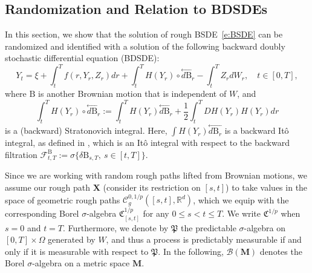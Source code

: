 \documentclass[11pt,reqno]{amsart}
\numberwithin{equation}{section}
\def\R{\mathbb R}
\begin{document}
\subsection{Randomization and Relation to BDSDEs}\label{subsec:randomization of BDSDEs}
In this section, we show that the solution of rough BSDE~\eqref{e:BSDE} can be randomized and identified with a solution of the following backward doubly stochastic differential equation (BDSDE):
\begin{equation}\label{e:BDSDE}
Y_{t} = \xi + \int_{t}^{T} f(r,Y_r,Z_r) dr + \int_{t}^{T} H(Y_r) \circ \overset{\leftarrow}{d \mathrm B}_r - \int_{t}^{T} Z_r dW_r,\quad t \in [0,T], 
\end{equation}
where $\mathrm B$ is another Brownian motion that is independent of $W$, and 
$$
\int_{t}^{T} H(Y_r) \circ \overset{\leftarrow}{d \mathrm B}_r := \int_{t}^{T} H(Y_r)  \overset{\leftarrow}{d \mathrm B}_r + \frac{1}{2}\int_{t}^{T} DH(Y_r)H(Y_r) dr
$$
is a (backward) Stratonovich integral. Here, $\int H(Y_r)  \overset{\leftarrow}{d \mathrm B_r}$ is a backward It\^o integral, as defined in \cite[Chapter~3.4]{Kunita90}, which is an It\^o integral with respect to the backward filtration $\mathcal F^{\mathrm B}_{t,T} := \sigma\{\delta \mathrm B_{s,T},\ s\in[t,T]\}$. 

Since we are working with random rough paths lifted from Brownian motions, we assume our rough path $\mathbf{X}$ (consider its restriction on $[s,t]$) to take values in the space of geometric rough paths $\mathscr{C}^{0,1/p}_g([s,t],\R^d)$, which we equip with the corresponding Borel $\sigma$-algebra $\mathfrak{C}^{1/p}_{[s,t]}$ for any $0\le s<t \le T$. We write $\mathfrak{C}^{1/p}$ when $s=0$ and $t=T$. Furthermore,
we denote by $\mathfrak P$ the predictable $\sigma$-algebra on $[0,T] \times \Omega$ generated by $W$, and thus a process is predictably measurable if and only if it is measurable with respect to $\mathfrak P$. In the following, $\mathcal B(\mathbf M)$ denotes the Borel $\sigma$-algebra on a metric space $\mathbf M$.
\end{document}
